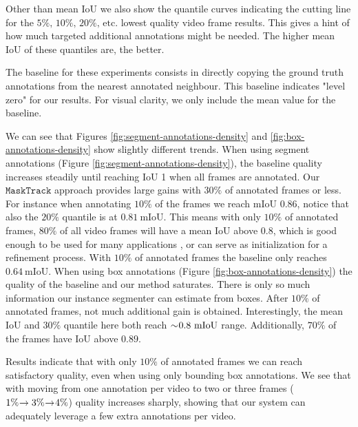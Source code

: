 \documentclass[10pt,twocolumn,letterpaper]{article}
\makeatletter
\renewcommand{\paragraph}{\@startsection{paragraph}{4}{\z@}{0.5ex \@plus 1ex \@minus .2ex}{-0.5em}{\normalfont \normalsize \bfseries}}
\makeatother
\begin{document}
Other than mean IoU we also show the quantile curves indicating the cutting line for the $5\%,\,10\%,\,20\%,\, \text{etc.}$ lowest quality video frame results. This gives a hint of how much targeted additional annotations might be needed.
The higher mean IoU of these quantiles are, the better.

The baseline for these experiments consists in directly copying the ground truth annotations from the nearest annotated neighbour. This baseline indicates "level zero" for our results. For visual clarity, we only include the mean value
for the baseline.


\paragraph{Analysis}
We can see that Figures \ref{fig:segment-annotations-density} and \ref{fig:box-annotations-density} show slightly different trends. When using segment annotations (Figure \ref{fig:segment-annotations-density}),
the baseline quality increases
steadily until reaching IoU 1 when all frames are annotated. Our $\mathtt{MaskTrack}$  approach provides large gains with $30\%$ of annotated frames or less. For instance when annotating $10\%$ of the frames we reach mIoU $0.86$,
notice that also the $20\%$ quantile is at $0.81\ \text{mIoU}$. This means with only $10\%$ of annotated frames, $80\%$ of all video frames will have a mean IoU above $0.8$, which is good enough to be used for many applications
, or can serve as initialization for a refinement process. With $10\%$ of annotated frames the baseline only reaches $0.64\ \text{mIoU}$.
When using box annotations (Figure \ref{fig:box-annotations-density}) the quality of the baseline and our method saturates. There is only so much information our instance segmenter can estimate from boxes. After $10\%$ of
annotated frames, not much additional gain is obtained. Interestingly, the mean IoU and $30\%$ quantile here both reach $\sim\negmedspace0.8\ \text{mIoU}$ range. Additionally, $70\%$ of the frames have IoU above $0.89$.

\paragraph{Conclusion}
Results indicate that with only $10\%$ of annotated frames we can reach satisfactory quality, even when using only bounding box annotations. We see that with moving from one annotation per video to two or three
frames ($1\%\negmedspace\rightarrow 3\%\negmedspace\rightarrow\negmedspace4\%$) quality increases sharply, showing that our system can adequately leverage a few extra annotations per video.
\end{document}
